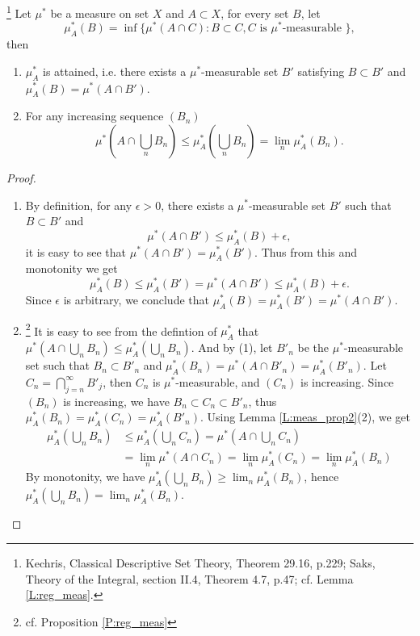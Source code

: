 \begin{lemma}  \label{L:reg_meas3}
  \footnote{
    Kechris, Classical Descriptive Set Theory, Theorem 29.16, p.229;
    Saks, Theory of the Integral, section II.4, Theorem 4.7, p.47;
    cf. Lemma \ref{L:reg_meas}.
  }
  Let $\mu^*$ be a measure on set $X$ and $A\subset X$,
  for every set $B$, let
  \[
    \mu^*_A(B)=\inf \{\mu^*(A\cap C): B\subset C, 
                      \text{$C$ is $\mu^*$-measurable } \},
  \]
then 
\begin{enumerate}
  \item[(1)] $\mu^*_A$ is attained, i.e. there exists a $\mu^*$-measurable
    set $B'$ satisfying $B\subset B'$ and $\mu^*_A(B)=\mu^*(A\cap B')$.
  \item[(2)]
    For any increasing sequence $(B_n)$
    \[
      \mu^*(A\cap \bigcup_n B_n)\le \mu^*_A(\bigcup_n B_n) = \lim_n \mu^*_A(B_n).
    \]
\end{enumerate}

\end{lemma}
\begin{proof}
\begin{enumerate}
  \item[(1)]
  By definition, for any $\epsilon>0$, there exists a $\mu^*$-measurable set
  $B'$ such that $B\subset B'$ and
  \[
    \mu^*(A\cap B')\le \mu^*_A(B) + \epsilon,
  \]
  it is easy to see that $\mu^*(A\cap B')= \mu^*_A(B')$. Thus from this and
  monotonity we get
  \[
    \mu^*_A(B) \le \mu^*_A(B') = \mu^*(A\cap B') \le \mu^*_A(B) + \epsilon.
  \]
  Since $\epsilon$ is arbitrary, we conclude that 
  $\mu^*_A(B) = \mu^*_A(B') = \mu^*(A\cap B')$.
  \item[(2)]
  \footnote{cf. Proposition \ref{P:reg_meas}}
  It is easy to see from the defintion of $\mu^*_A$ that
  $\mu^*(A\cap \bigcup_n B_n)\le \mu^*_A(\bigcup_n B_n)$.
  And by (1), let $B'_n$ be the $\mu^*$-measurable set such that 
  $B_n\subset B'_n$ and $\mu^*_A(B_n) = \mu^*(A\cap B'_n) = \mu^*_A(B'_n)$. 
  Let $C_n=\bigcap_{j=n}^{\infty}B'_j$, then $C_n$ is $\mu^*$-measurable, 
  and $(C_n)$ is increasing. 
  Since $(B_n)$ is increasing, we have $B_n\subset C_n\subset B'_n$, thus
  $\mu^*_A(B_n) = \mu^*_A(C_n) = \mu^*_A(B'_n)$. 
  Using Lemma \ref{L:meas_prop2}(2), we get
  \begin{align*}
    \mu^*_A(\bigcup_n B_n) 
      &\le \mu^*_A(\bigcup_n C_n) = \mu^*(A\cap \bigcup_n C_n) \\
      &= \lim_n \mu^*(A\cap C_n) = \lim_n \mu^*_A(C_n) = \lim_n \mu^*_A(B_n)
  \end{align*}
  By monotonity, we have $\mu^*_A(\bigcup_n B_n) \ge \lim_n \mu^*_A(B_n)$,
  hence $\mu^*_A(\bigcup_n B_n) = \lim_n \mu^*_A(B_n)$.
\end{enumerate}
\end{proof}

